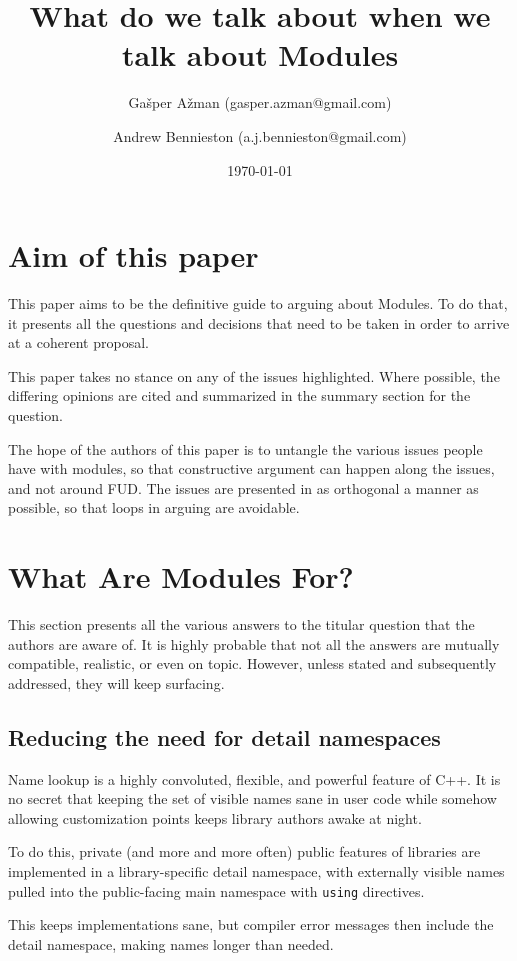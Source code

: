 \documentclass[reqno]{article}
\title{What do we talk about when we talk about Modules}
\author{Gašper Ažman \small{(gasper.azman@gmail.com)}
\and Andrew Bennieston \small{(a.j.bennieston@gmail.com)}}
\date{\today}
\begin{document}
\maketitle
\section{Aim of this paper}

This paper aims to be the definitive guide to arguing about Modules. To do
that, it presents all the questions and decisions that need to be taken in
order to arrive at a coherent proposal.

This paper takes no stance on any of the issues highlighted. Where possible, the
differing opinions are cited and summarized in the summary section for the
question.

The hope of the authors of this paper is to untangle the various issues people
have with modules, so that constructive argument can happen along the issues,
and not around FUD. The issues are presented in as orthogonal a manner as
possible, so that loops in arguing are avoidable.


\section{What Are Modules For?}

This section presents all the various answers to the titular question that the
authors are aware of. It is highly probable that not all the answers are
mutually compatible, realistic, or even on topic. However, unless stated and
subsequently addressed, they will keep surfacing.


\subsection{Reducing the need for detail namespaces}

Name lookup is a highly convoluted, flexible, and powerful feature of C++. It
is no secret that keeping the set of visible names sane in user code while
somehow allowing customization points keeps library authors awake at night. 

To do this, private (and more and more often) public features of libraries are
implemented in a library-specific detail namespace, with externally visible
names pulled into the public-facing main namespace with \texttt{using}
directives.

This keeps implementations sane, but compiler error messages then include the
detail namespace, making names longer than needed.
\end{document}
